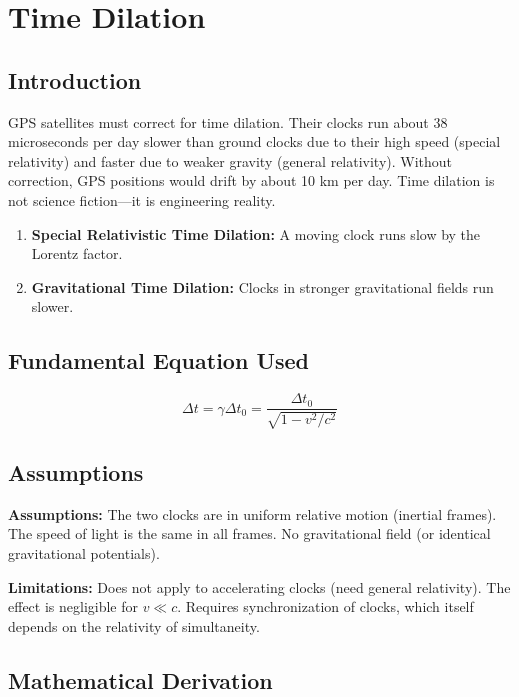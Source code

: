 \chapter{Time Dilation}

\section*{Introduction}

GPS satellites must correct for time dilation. Their clocks run about 38 microseconds per day slower than ground clocks due to their high speed (special relativity) and faster due to weaker gravity (general relativity). Without correction, GPS positions would drift by about 10 km per day. Time dilation is not science fiction---it is engineering reality.

\begin{enumerate}
\item \textbf{Special Relativistic Time Dilation:} A moving clock runs slow by the Lorentz factor.

\item \textbf{Gravitational Time Dilation:} Clocks in stronger gravitational fields run slower.

\end{enumerate}
\section*{Fundamental Equation Used}

\[
\Delta t = \gamma \Delta t_0 = \frac{\Delta t_0}{\sqrt{1 - v^2/c^2}}
\]


\section*{Assumptions}

\textbf{Assumptions:} The two clocks are in uniform relative motion (inertial frames). The speed of light is the same in all frames. No gravitational field (or identical gravitational potentials).


\textbf{Limitations:} Does not apply to accelerating clocks (need general relativity). The effect is negligible for $v \ll c$. Requires synchronization of clocks, which itself depends on the relativity of simultaneity.


\section*{Mathematical Derivation}

